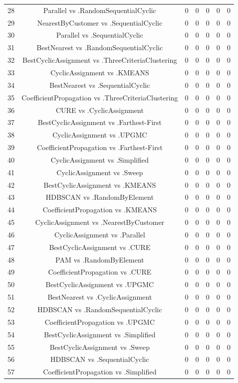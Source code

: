 \documentclass[a4paper,10pt]{article}
\begin{document}
\begin{landscape}
\begin{table}[!htp]
\begin{tabular}{ccccccc}
28&Parallel vs .RandomSequentialCyclic&0&0&0&0&0\\
29&NearestByCustomer vs .SequentialCyclic&0&0&0&0&0\\
30&Parallel vs .SequentialCyclic&0&0&0&0&0\\
31&BestNearest vs .RandomSequentialCyclic&0&0&0&0&0\\
32&BestCyclicAssignment vs .ThreeCriteriaClustering&0&0&0&0&0\\
33&CyclicAssignment vs .KMEANS&0&0&0&0&0\\
34&BestNearest vs .SequentialCyclic&0&0&0&0&0\\
35&CoefficientPropagation vs .ThreeCriteriaClustering&0&0&0&0&0\\
36&CURE vs .CyclicAssignment&0&0&0&0&0\\
37&BestCyclicAssignment vs .Farthest-First&0&0&0&0&0\\
38&CyclicAssignment vs .UPGMC&0&0&0&0&0\\
39&CoefficientPropagation vs .Farthest-First&0&0&0&0&0\\
40&CyclicAssignment vs .Simplified&0&0&0&0&0\\
41&CyclicAssignment vs .Sweep&0&0&0&0&0\\
42&BestCyclicAssignment vs .KMEANS&0&0&0&0&0\\
43&HDBSCAN vs .RandomByElement&0&0&0&0&0\\
44&CoefficientPropagation vs .KMEANS&0&0&0&0&0\\
45&CyclicAssignment vs .NearestByCustomer&0&0&0&0&0\\
46&CyclicAssignment vs .Parallel&0&0&0&0&0\\
47&BestCyclicAssignment vs .CURE&0&0&0&0&0\\
48&PAM vs .RandomByElement&0&0&0&0&0\\
49&CoefficientPropagation vs .CURE&0&0&0&0&0\\
50&BestCyclicAssignment vs .UPGMC&0&0&0&0&0\\
51&BestNearest vs .CyclicAssignment&0&0&0&0&0\\
52&HDBSCAN vs .RandomSequentialCyclic&0&0&0&0&0\\
53&CoefficientPropagation vs .UPGMC&0&0&0&0&0\\
54&BestCyclicAssignment vs .Simplified&0&0&0&0&0\\
55&BestCyclicAssignment vs .Sweep&0&0&0&0&0\\
56&HDBSCAN vs .SequentialCyclic&0&0&0&0&0\\
57&CoefficientPropagation vs .Simplified&0&0&0&0&0\\

\end{tabular}
\end{table}
\end{landscape}
\end{document}

